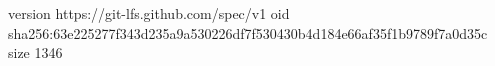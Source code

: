 version https://git-lfs.github.com/spec/v1
oid sha256:63e225277f343d235a9a530226df7f530430b4d184e66af35f1b9789f7a0d35c
size 1346
